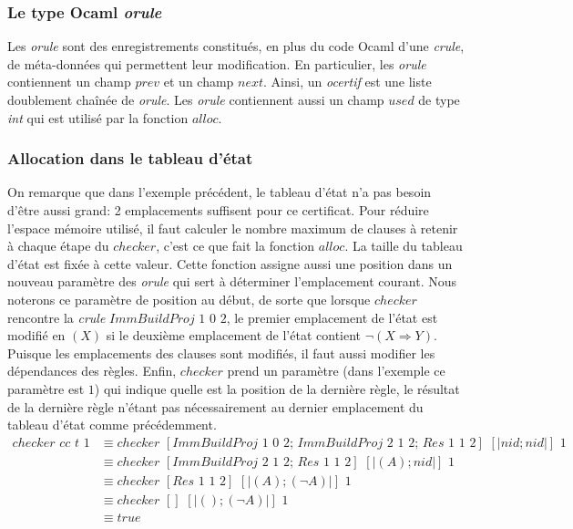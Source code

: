 \documentclass[11pt]{article}
\begin{document}
\subsubsection{Le type Ocaml \textit{orule}}

 Les \textit{orule} sont des enregistrements constitués, en plus du code Ocaml d'une \textit{crule}, de méta-données qui permettent leur modification. En particulier, les \textit{orule} contiennent un champ $prev$ et un champ $next$. Ainsi, un \textit{ocertif} est une liste doublement chaînée de \textit{orule}. Les \textit{orule} contiennent aussi un champ $used$ de type \textit{int} qui est utilisé par la fonction $alloc$.


\subsubsection{Allocation dans le tableau d'état} \label{alloc}

On remarque que dans l'exemple précédent, le tableau d'état n'a pas besoin d'être aussi grand: 2 emplacements suffisent pour ce certificat. Pour réduire l'espace mémoire utilisé, il faut calculer le nombre maximum de clauses à retenir à chaque étape du $checker$, c'est ce que fait la fonction $alloc$. La taille du tableau d'état est fixée à cette valeur. Cette fonction assigne aussi une position dans un nouveau paramètre des \textit{orule} qui sert à déterminer l'emplacement courant. Nous noterons ce paramètre de position au début, de sorte que lorsque $checker$ rencontre la \textit{crule} $ImmBuildProj \,\, 1\,\, 0 \,\, 2$, le premier emplacement de l'état est modifié en $(X)$ si le deuxième emplacement de l'état contient $\neg(X \Rightarrow Y)$. Puisque les emplacements des clauses sont modifiés, il faut aussi modifier les dépendances des règles. Enfin, $checker$ prend un paramètre (dans l'exemple ce paramètre est $1$) qui indique quelle est la position de la dernière règle, le résultat de la dernière règle n'étant pas nécessairement au dernier emplacement du tableau d'état comme précédemment.
\begin{align*}
    checker \,\, cc \,\, t \,\, 1 &\equiv checker \,\, [ImmBuildProj \,\, 1\,\, 0 \,\, 2; \,ImmBuildProj \,\, 2\,\, 1 \,\, 2; \, Res \,\, 1 \,\, 1 \,\, 2] \,\, [| nid; nid|] \,\, 1 \\
    &\equiv checker \,\, [ImmBuildProj \,\, 2 \,\, 1 \,\, 2; \, Res \,\, 1 \,\, 1 \,\, 2] \,\, [| (A); nid|] \,\, 1 \\
    &\equiv checker \,\, [Res \,\, 1 \,\, 1 \,\, 2] \,\, [| (A); (\neg A)|] \,\, 1 \\
    &\equiv checker \,\, [] \,\, [| (); (\neg A)|] \,\, 1 \\
    &\equiv true
\end{align*}
\end{document}
